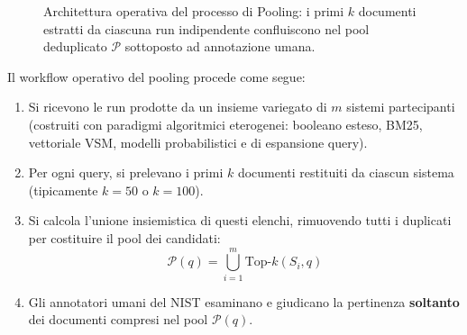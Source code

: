 \begin{figure}[H]
{%
}
\caption{Architettura operativa del processo di Pooling: i primi $k$ documenti estratti da ciascuna run indipendente confluiscono nel pool deduplicato $\mathcal{P}$ sottoposto ad annotazione umana.}
\label{fig:pooling-process}
\end{figure}

Il workflow operativo del pooling procede come segue:
\begin{enumerate}
    \item Si ricevono le run prodotte da un insieme variegato di $m$ sistemi partecipanti (costruiti con paradigmi algoritmici eterogenei: booleano esteso, BM25, vettoriale VSM, modelli probabilistici e di espansione query).
    \item Per ogni query, si prelevano i primi $k$ documenti restituiti da ciascun sistema (tipicamente $k = 50$ o $k = 100$).
    \item Si calcola l'unione insiemistica di questi elenchi, rimuovendo tutti i duplicati per costituire il pool dei candidati:
    \begin{equation}
    \mathcal{P}(q) = \bigcup_{i=1}^m \text{Top-}k(S_i, q)
    \end{equation}
    \item Gli annotatori umani del NIST esaminano e giudicano la pertinenza \textbf{soltanto} dei documenti compresi nel pool $\mathcal{P}(q)$.
\end{enumerate}

